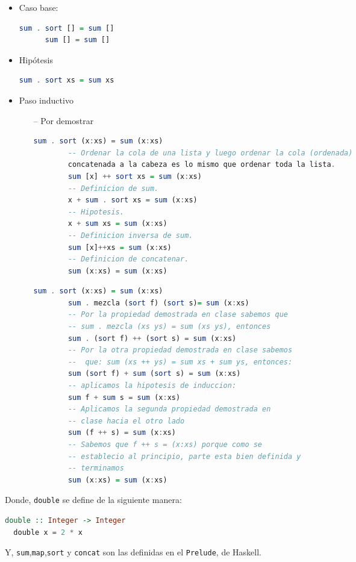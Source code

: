 \documentclass[spanish,12pt,letterpaper]{article}
\begin{document}
\begin{itemize}
\begin{itemize}
    \item Caso base:
    \begin{lstlisting}[language=Haskell]
      sum . sort [] = sum []
      sum [] = sum []
    \end{lstlisting}
  \item Hipótesis
    \begin{lstlisting}[language=Haskell]
      sum . sort xs = sum xs
    \end{lstlisting}
  \item Paso inductivo
    \begin{itemize}
    \item [--] Por demostrar
    \begin{lstlisting}[language=Haskell]
        sum . sort (x:xs) = sum (x:xs)
        -- Ordenar la cola de una lista y luego ordenar la cola (ordenada)
        concatenada a la cabeza es lo mismo que ordenar toda la lista.
        sum [x] ++ sort xs = sum (x:xs)
        -- Definicion de sum.
        x + sum . sort xs = sum (x:xs)
        -- Hipotesis.
        x + sum xs = sum (x:xs)
        -- Definicion inversa de sum.
        sum [x]++xs = sum (x:xs)
        -- Definicion de concatenar.
        sum (x:xs) = sum (x:xs)
      \end{lstlisting}
    \begin{lstlisting}[language=Haskell]
        sum . sort (x:xs) = sum (x:xs)
        sum . mezcla (sort f) (sort s)= sum (x:xs)
        -- Por la propiedad demostrada en clase sabemos que
        -- sum . mezcla (xs ys) = sum (xs ys), entonces
        sum . (sort f) ++ (sort s) = sum (x:xs)
        -- Por la otra propiedad demostrada en clase sabemos
        --  que: sum (xs ++ ys) = sum xs + sum ys, entonces:
        sum (sort f) + sum (sort s) = sum (x:xs)
        -- aplicamos la hipotesis de induccion:
        sum f + sum s = sum (x:xs)
        -- Aplicamos la segunda propiedad demostrada en
        -- clase hacia el otro lado
        sum (f ++ s) = sum (x:xs)
        -- Sabemos que f ++ s = (x:xs) porque como se
        -- establecio al principio, parte esta bien definida y
        -- terminamos
        sum (x:xs) = sum (x:xs)
    \end{lstlisting}

    \end{itemize}


  \end{itemize}

\end{itemize}
Donde, \texttt{double} se define de la siguiente manera:
\begin{lstlisting}[language=Haskell]
  double :: Integer -> Integer
  double x = 2 * x
\end{lstlisting}
Y, \texttt{sum},\texttt{map},\texttt{sort} y \texttt{concat} son las definidas en
el \texttt{Prelude}, de Haskell.
\end{document}
